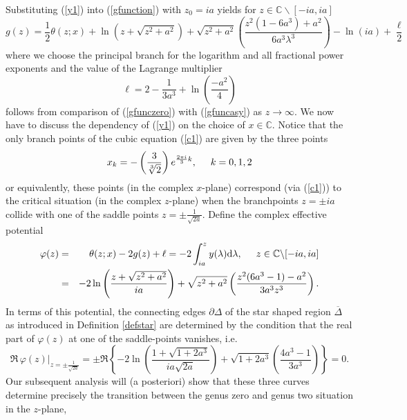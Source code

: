\documentclass[10pt,oneside,reqno]{amsart}
\numberwithin{equation}{section}
\renewcommand{\d}{{\mathrm d}}
\def\eqref#1{(\ref{#1})}
\begin{document}
Substituting \eqref{y1} into \eqref{gfunction} with $z_0=ia$ yields for $z\in\mathbb{C}\backslash[-ia,ia]$
\begin{equation}\label{gfunczero}
  g(z)=\frac{1}{2}\theta(z;x) +\ln\left(z+\sqrt{z^2+a^2}\right)+\sqrt{z^2+a^2}\left(\frac{z^2(1-6a^3)+a^2}{6a^3\lambda^3}\right)
-\ln(ia)+\frac{\ell}{2}
\end{equation}
where we choose the principal branch for the logarithm and all fractional power exponents and the value of the Lagrange multiplier
\begin{equation}\label{Lagra}
  \ell = 2-\frac{1}{3a^3}+\ln\left(\frac{-a^2}{4}\right)
\end{equation}
follows from comparison of \eqref{gfunczero} with \eqref{gfuncasy} as $z\rightarrow\infty$. We now have to discuss the dependency of \eqref{y1} on the choice of $x\in\mathbb{C}$.
Notice that the only branch points of the cubic equation \eqref{c1} are given by the three points 
\begin{equation}\label{xcrit}
  x_k = -\left(\frac{3}{\sqrt[3]{2}}\right) e^{\frac{2\pi i}{3}k},\hspace{0.5cm}k=0,1,2
\end{equation}
or equivalently, these points (in the complex $x$-plane) correspond (via \eqref{c1}) to the critical situation (in the complex $z$-plane) when the branchpoints $z=\pm ia$ collide with one of the
saddle points $z=\pm \frac{1}{\sqrt{2a}}$. Define the complex effective potential
\begin{eqnarray*}
  \varphi(z) &=& \theta(z;x)-2g(z)+\ell = -2\int_{ia}^{z}y(\lambda)\d\lambda,\hspace{0.5cm}z\in\mathbb{C}\backslash[-ia,ia]\\
&=&-2\ln\left(\frac{z+\sqrt{z^2+a^2}}{ia}\right)+\sqrt{z^2+a^2}\left(\frac{z^2(6a^3-1)-a^2}{3a^3z^3}\right).
\end{eqnarray*}
In terms of this potential, the connecting edges $\partial\Delta$ of the star shaped region $\overline{\Delta}$ as introduced in Definition \ref{defstar} are determined
by the condition that the real part of $\varphi(z)$ at one of the saddle-points vanishes, i.e. 
\begin{equation}\label{b1}
  \Re\,\varphi(z)\Big|_{z=\pm\frac{1}{\sqrt{2a}}} = \pm \Re\left\{-2\ln\left(\frac{1+\sqrt{1+2a^3}}{ia\sqrt{2a}}\right)+
\sqrt{1+2a^3}\left(\frac{4a^3-1}{3a^3}\right)\right\}=0.
\end{equation}
Our subsequent analysis will (a posteriori) show that these three curves determine precisely the transition between the genus zero and genus two situation in the $z$-plane,
\end{document}
